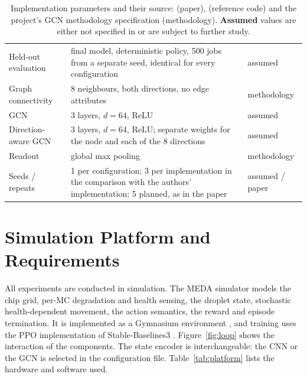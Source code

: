\documentclass[11pt,a4paper]{article}
\begin{document}
\begin{table}[H]
\begin{tabularx}{\textwidth}{lXl}
Held-out evaluation & final model, deterministic policy, 500 jobs from a separate seed, identical for every configuration & assumed \\
Graph connectivity & 8 neighbours, both directions, no edge attributes & methodology \\
GCN & 3 layers, $d=64$, ReLU & assumed \\
Direction-aware GCN & 3 layers, $d=64$, ReLU; separate weights for the node and each of the 8 directions & assumed \\
Readout & global max pooling & methodology \\
Seeds / repeats & 1 per configuration; 3 per implementation in the comparison with the authors' implementation; 5 planned, as in the paper & assumed / paper \\
\bottomrule
\end{tabularx}
\caption{Implementation parameters and their source: \cite{elfar2023} (paper),
  \cite{elfarcode} (reference code) and the project's GCN methodology
  specification (methodology). \textbf{Assumed} values are either not
  specified in \cite{elfar2023} or are subject to further study.}
\label{tab:params}
\end{table}

\section{Simulation Platform and Requirements}\label{sec:platform}

All experiments are conducted in simulation. The MEDA simulator models the
chip grid, per-MC degradation and health sensing, the droplet state,
stochastic health-dependent movement, the action semantics, the reward and
episode termination. It is implemented as a Gymnasium environment
\cite{towers2024}, and training uses the PPO implementation of
Stable-Baselines3 \cite{raffin2021}. Figure~\ref{fig:loop} shows the
interaction of the components. The state encoder is interchangeable: the CNN
or the GCN is selected in the configuration file. Table~\ref{tab:platform}
lists the hardware and software used.
\end{document}
